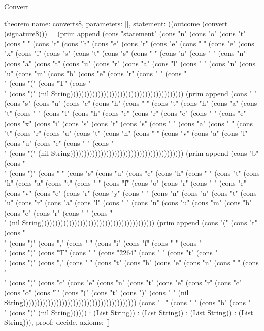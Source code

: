 \begin{lexlean}{Convert}
\begin{semanticmodule}
theorem{
  name: converts8,
  parameters: [],
  statement: ((outcome (convert (signature8))) = (prim append (cons "statement" (cons "n" (cons "o" (cons "t" (cons " " (cons "t" (cons "h" (cons "e" (cons "r" (cons "e" (cons " " (cons "e" (cons "x" (cons "i" (cons "s" (cons "t" (cons "s" (cons " " (cons "a" (cons " " (cons "n" (cons "a" (cons "t" (cons "u" (cons "r" (cons "a" (cons "l" (cons " " (cons "n" (cons "u" (cons "m" (cons "b" (cons "e" (cons "r" (cons " " (cons "\\" (cons "(" (cons "T" (cons "\\" (cons ")" (nil String))))))))))))))))))))))))))))))))))))))))) (prim append (cons " " (cons "s" (cons "u" (cons "c" (cons "h" (cons " " (cons "t" (cons "h" (cons "a" (cons "t" (cons " " (cons "t" (cons "h" (cons "e" (cons "r" (cons "e" (cons " " (cons "e" (cons "x" (cons "i" (cons "s" (cons "t" (cons "s" (cons " " (cons "a" (cons " " (cons "t" (cons "r" (cons "u" (cons "t" (cons "h" (cons " " (cons "v" (cons "a" (cons "l" (cons "u" (cons "e" (cons " " (cons "\\" (cons "(" (nil String))))))))))))))))))))))))))))))))))))))))) (prim append (cons "b" (cons "\\" (cons ")" (cons " " (cons "s" (cons "u" (cons "c" (cons "h" (cons " " (cons "t" (cons "h" (cons "a" (cons "t" (cons " " (cons "f" (cons "o" (cons "r" (cons " " (cons "e" (cons "v" (cons "e" (cons "r" (cons "y" (cons " " (cons "n" (cons "a" (cons "t" (cons "u" (cons "r" (cons "a" (cons "l" (cons " " (cons "n" (cons "u" (cons "m" (cons "b" (cons "e" (cons "r" (cons " " (cons "\\" (nil String))))))))))))))))))))))))))))))))))))))))) (prim append (cons "(" (cons "t" (cons "\\" (cons ")" (cons "," (cons " " (cons "i" (cons "f" (cons " " (cons "\\" (cons "(" (cons "T" (cons " " (cons "\u2264" (cons " " (cons "t" (cons "\\" (cons ")" (cons "," (cons " " (cons "t" (cons "h" (cons "e" (cons "n" (cons " " (cons "\\" (cons "(" (cons "c" (cons "e" (cons "n" (cons "t" (cons "e" (cons "r" (cons "c" (cons "o" (cons "l" (cons "(" (cons "t" (cons ")" (cons " " (nil String))))))))))))))))))))))))))))))))))))))))) (cons "=" (cons " " (cons "b" (cons "\\" (cons ")" (nil String)))))) : (List String)) : (List String)) : (List String)) : (List String))),
  proof: decide{},
  axioms: []
}


\end{semanticmodule}
\end{lexlean}
